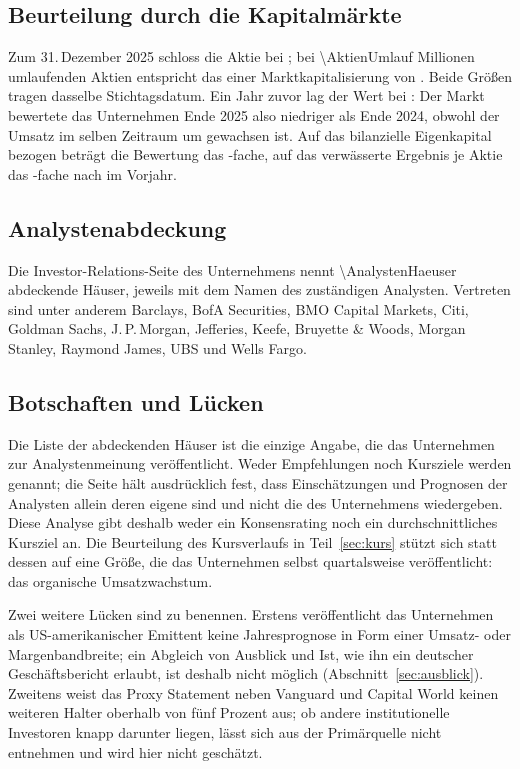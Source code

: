\subsection{Beurteilung durch die Kapitalm\"arkte}

Zum 31.\,Dezember 2025 schloss die Aktie bei \USDje{\KursSchlussZFV}; bei
\num{\AktienUmlauf} Millionen umlaufenden Aktien entspricht das einer
Marktkapitalisierung von \MioUSD{\Marktkapitalisierung}. Beide Gr\"o{\ss}en
tragen dasselbe Stichtagsdatum. Ein Jahr zuvor lag der Wert bei
\MioUSD{\MarktkapitalisierungVJ}: Der Markt bewertete das Unternehmen Ende
2025 also niedriger als Ende 2024, obwohl der Umsatz im selben Zeitraum um
\Pct{\UmsatzDelta} gewachsen ist. Auf das bilanzielle Eigenkapital bezogen
betr\"agt die Bewertung das \Faktor{\KursBuchwert}-fache, auf das
verw\"asserte Ergebnis je Aktie das \Faktor{\KGV}-fache nach
\Faktor{\KGVVJ} im Vorjahr.

\subsection{Analystenabdeckung}

Die Investor-Relations-Seite des Unternehmens nennt
\num{\AnalystenHaeuser} abdeckende H\"auser, jeweils mit dem Namen des
zust\"andigen Analysten. Vertreten sind unter anderem Barclays, BofA
Securities, BMO Capital Markets, Citi, Goldman Sachs, J.\,P.\,Morgan,
Jefferies, Keefe, Bruyette \& Woods, Morgan Stanley, Raymond James, UBS und
Wells Fargo.

\subsection{Botschaften und L\"ucken}
\label{sec:luecken}

Die Liste der abdeckenden H\"auser ist die einzige Angabe, die das
Unternehmen zur Analystenmeinung ver\"offentlicht. Weder Empfehlungen noch
Kursziele werden genannt; die Seite h\"alt ausdr\"ucklich fest, dass
Einsch\"atzungen und Prognosen der Analysten allein deren eigene sind und
nicht die des Unternehmens
wiedergeben. Diese Analyse
gibt deshalb weder ein Konsensrating noch ein durchschnittliches Kursziel
an. Die Beurteilung des Kursverlaufs in Teil~\ref{sec:kurs} st\"utzt sich
statt dessen auf eine Gr\"o{\ss}e, die das Unternehmen selbst quartalsweise
ver\"offentlicht: das organische Umsatzwachstum.

Zwei weitere L\"ucken sind zu benennen. Erstens ver\"offentlicht das
Unternehmen als US-amerikanischer Emittent keine Jahresprognose in Form
einer Umsatz- oder Margenbandbreite; ein Abgleich von Ausblick und Ist, wie
ihn ein deutscher Gesch\"aftsbericht erlaubt, ist deshalb nicht m\"oglich
(Abschnitt~\ref{sec:ausblick}). Zweitens weist das Proxy Statement neben
Vanguard und Capital World keinen weiteren Halter oberhalb von f\"unf
Prozent aus; ob andere institutionelle Investoren knapp darunter liegen,
l\"asst sich aus der Prim\"arquelle nicht entnehmen und wird hier nicht
gesch\"atzt.

